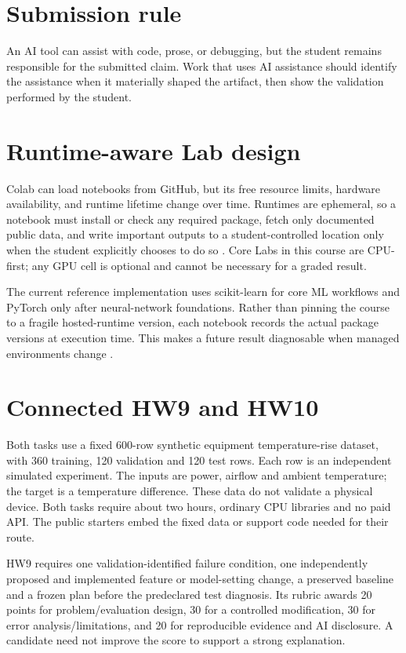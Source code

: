 \section{Submission rule}
An AI tool can assist with code, prose, or debugging, but the student remains responsible for the submitted claim. Work that uses AI assistance should identify the assistance when it materially shaped the artifact, then show the validation performed by the student.

\section{Runtime-aware Lab design}
Colab can load notebooks from GitHub, but its free resource limits, hardware availability, and runtime lifetime change over time. Runtimes are ephemeral, so a notebook must install or check any required package, fetch only documented public data, and write important outputs to a student-controlled location only when the student explicitly chooses to do so \citep{googlecolab2026}. Core Labs in this course are CPU-first; any GPU cell is optional and cannot be necessary for a graded result.

The current reference implementation uses scikit-learn for core ML workflows and PyTorch only after neural-network foundations. Rather than pinning the course to a fragile hosted-runtime version, each notebook records the actual package versions at execution time. This makes a future result diagnosable when managed environments change \citep{sklearn2026,pytorch2026}.

\section{Connected HW9 and HW10}
Both tasks use a fixed 600-row synthetic equipment temperature-rise dataset, with 360 training, 120 validation and 120 test rows. Each row is an independent simulated experiment. The inputs are power, airflow and ambient temperature; the target is a temperature difference. These data do not validate a physical device. Both tasks require about two hours, ordinary CPU libraries and no paid API. The public starters embed the fixed data or support code needed for their route.

HW9 requires one validation-identified failure condition, one independently proposed and implemented feature or model-setting change, a preserved baseline and a frozen plan before the predeclared test diagnosis. Its rubric awards 20 points for problem/evaluation design, 30 for a controlled modification, 30 for error analysis/limitations, and 20 for reproducible evidence and AI disclosure. A candidate need not improve the score to support a strong explanation.

